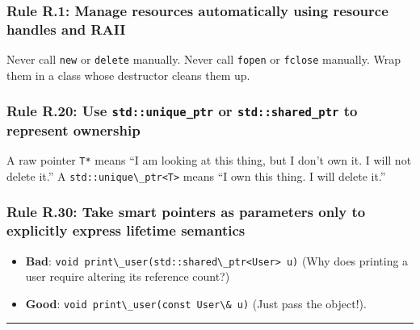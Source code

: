 \hypertarget{rule-r.1-manage-resources-automatically-using-resource-handles-and-raii}{%
\subsubsection{Rule R.1: Manage resources automatically using resource
handles and
RAII}\label{rule-r.1-manage-resources-automatically-using-resource-handles-and-raii}}

Never call \passthrough{\lstinline!new!} or
\passthrough{\lstinline!delete!} manually. Never call
\passthrough{\lstinline!fopen!} or \passthrough{\lstinline!fclose!}
manually. Wrap them in a class whose destructor cleans them up.

\hypertarget{rule-r.20-use-stdunique_ptr-or-stdshared_ptr-to-represent-ownership}{%
\subsubsection{\texorpdfstring{Rule R.20: Use \texttt{std::unique\_ptr}
or \texttt{std::shared\_ptr} to represent
ownership}{Rule R.20: Use std::unique\_ptr or std::shared\_ptr to represent ownership}}\label{rule-r.20-use-stdunique_ptr-or-stdshared_ptr-to-represent-ownership}}

A raw pointer \passthrough{\lstinline!T*!} means ``I am looking at this
thing, but I don't own it. I will not delete it.'' A
\passthrough{\lstinline!std::unique\_ptr<T>!} means ``I own this thing.
I will delete it.''

\hypertarget{rule-r.30-take-smart-pointers-as-parameters-only-to-explicitly-express-lifetime-semantics}{%
\subsubsection{Rule R.30: Take smart pointers as parameters only to
explicitly express lifetime
semantics}\label{rule-r.30-take-smart-pointers-as-parameters-only-to-explicitly-express-lifetime-semantics}}

\begin{itemize}
\tightlist
\item
  \textbf{Bad}:
  \passthrough{\lstinline!void print\_user(std::shared\_ptr<User> u)!}
  (Why does printing a user require altering its reference count?)
\item
  \textbf{Good}:
  \passthrough{\lstinline!void print\_user(const User\& u)!} (Just pass
  the object!).
\end{itemize}

\begin{center}\rule{0.5\linewidth}{0.5pt}\end{center}

